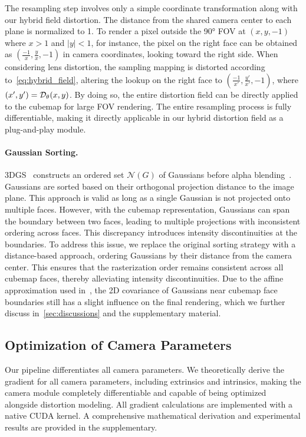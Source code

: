 The resampling step involves only a simple coordinate transformation along with our hybrid field distortion. The distance from the shared camera center to each plane is normalized to 1. To render a pixel outside the 90\si{\degree} FOV at $(x, y, -1)$ where $x>1$ and $|y|<1$, for instance, the pixel on the right face can be obtained as $(\frac{-1}{x}, \frac{y}{x}, -1)$ in camera coordinates, looking toward the right side. When considering lens distortion, the sampling mapping is distorted according to~\cref{eq:hybrid_field}, altering the lookup on the right face to $(\frac{-1}{x'}, \frac{y'}{x'}, -1)$, where $(x', y') = \mathcal{D}_\theta(x, y)$. By doing so, the entire distortion field can be directly applied to the cubemap for large FOV rendering. The entire resampling process is fully differentiable, making it directly applicable in our hybrid distortion field as a plug-and-play module.

\paragraph{Gaussian Sorting.} 
3DGS~\cite{kerbl20233d} constructs an ordered set $\mathcal{N}(G)$ of Gaussians before alpha blending~\cite{kerbl20233d}. Gaussians are sorted based on their orthogonal projection distance to the image plane. This approach is valid as long as a single Gaussian is not projected onto multiple faces. However, with the cubemap representation, Gaussians can span the boundary between two faces, leading to multiple projections with inconsistent ordering across faces. This discrepancy introduces intensity discontinuities at the boundaries.
To address this issue, we replace the original sorting strategy with a distance-based approach, ordering Gaussians by their distance from the camera center. This ensures that the rasterization order remains consistent across all cubemap faces, thereby alleviating intensity discontinuities. 
Due to the affine approximation used in~\cite{kerbl20233d,zwicker2001ewa}, the 2D covariance of Gaussians near cubemap face boundaries still has a slight influence on the final rendering, which we further discuss in~\cref{sec:discussions} and the supplementary material.

\subsection{Optimization of Camera Parameters} 
\label{sec:opt_cam}
Our pipeline differentiates all camera parameters. We theoretically derive the gradient for all camera parameters, including extrinsics and intrinsics, making the camera module completely differentiable and capable of being optimized alongside distortion modeling. All gradient calculations are implemented with a native CUDA kernel. A comprehensive mathematical derivation and experimental results are provided in the supplementary.





